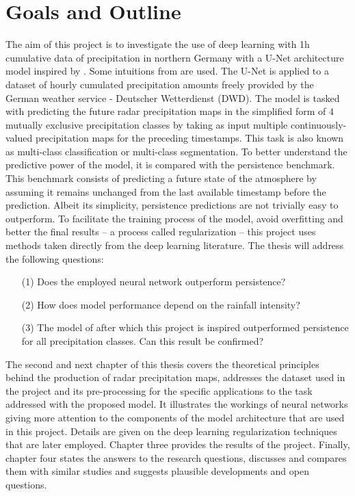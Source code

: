\section{Goals and Outline}\label{sec:researchquestions}
The aim of this project is to investigate the use of deep learning with 1h cumulative data of precipitation in northern Germany with a U-Net architecture model inspired by \citet{Agrawal2019MachineImages}. Some intuitions from \citet{Ayzel2020RainNetNowcasting} are used. The U-Net is applied to a dataset of hourly cumulated precipitation amounts freely provided by the German weather service - Deutscher Wetterdienst (DWD). The model is tasked with predicting the future radar precipitation maps in the simplified form of 4 mutually exclusive precipitation classes by taking as input multiple continuously-valued precipitation maps for the preceding timestamps. This task is also known as multi-class classification or multi-class segmentation. To better understand the predictive power of the model, it is compared with the persistence benchmark. This benchmark consists of predicting a future state of the atmosphere by assuming it remains unchanged from the last available timestamp before the prediction. Albeit its simplicity, persistence predictions are not trivially easy to outperform. To facilitate the training process of the model, avoid overfitting and better the final results -- a process called regularization -- this project uses methods taken directly from the deep learning literature.
The thesis will address the following questions:
\begin{itemize}
\item[(1)] Does the employed neural network outperform persistence?
\item[(2)] How does model performance depend on the rainfall intensity?
\item[(3)] The model of \citet{Agrawal2019MachineImages} after which this project is inspired outperformed persistence for all precipitation classes. Can this result be confirmed?
\end{itemize}

The second and next chapter of this thesis covers the theoretical principles behind the production of radar precipitation maps, addresses the dataset used in the project and its pre-processing for the specific applications to the task addressed with the proposed model. It illustrates the workings of neural networks giving more attention to the components of the model architecture that are used in this project. Details are given on the deep learning regularization techniques that are later employed. Chapter three provides the results of the project. Finally, chapter four states the answers to the research questions, discusses and compares them with similar studies and suggests plausible developments and open questions.


